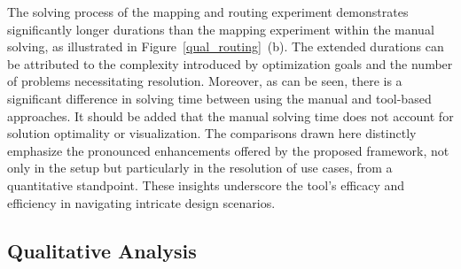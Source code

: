     The solving process of the mapping and routing experiment demonstrates significantly longer durations than the mapping experiment within the manual solving, as illustrated in Figure~\ref{qual_routing}~(b). The extended durations can be attributed to the complexity introduced by optimization goals and the number of problems necessitating resolution. 
    Moreover, as can be seen, there is a significant difference in solving time between using the manual and tool-based approaches.
    It should be added that the manual solving time does not account for solution optimality or visualization. The comparisons drawn here distinctly emphasize the pronounced enhancements offered by the proposed framework, not only in the setup but particularly in the resolution of use cases, from a quantitative standpoint. These insights underscore the tool's efficacy and efficiency in navigating intricate design scenarios.
  
    

   

    
    
    
   
    

    \subsection{Qualitative Analysis}

    
